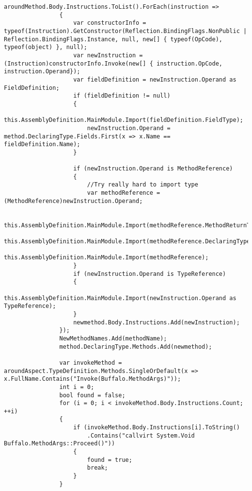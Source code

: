 \begin{lstlisting}[caption={../buffalo/Weaver.cs}, label=../buffalo/Weaver.cs, frame=tb, basicstyle=\scriptsize]
                aroundMethod.Body.Instructions.ToList().ForEach(instruction =>
                {
                    var constructorInfo = typeof(Instruction).GetConstructor(Reflection.BindingFlags.NonPublic | Reflection.BindingFlags.Instance, null, new[] { typeof(OpCode), typeof(object) }, null);
                    var newInstruction = (Instruction)constructorInfo.Invoke(new[] { instruction.OpCode, instruction.Operand});
                    var fieldDefinition = newInstruction.Operand as FieldDefinition;
                    if (fieldDefinition != null)
                    {
                        this.AssemblyDefinition.MainModule.Import(fieldDefinition.FieldType);
                        newInstruction.Operand = method.DeclaringType.Fields.First(x => x.Name == fieldDefinition.Name);
                    }

                    if (newInstruction.Operand is MethodReference)
                    {
                        //Try really hard to import type
                        var methodReference = (MethodReference)newInstruction.Operand;

                        this.AssemblyDefinition.MainModule.Import(methodReference.MethodReturnType.ReturnType);
                        this.AssemblyDefinition.MainModule.Import(methodReference.DeclaringType);
                        this.AssemblyDefinition.MainModule.Import(methodReference);
                    }
                    if (newInstruction.Operand is TypeReference)
                    {
                        this.AssemblyDefinition.MainModule.Import(newInstruction.Operand as TypeReference);
                    }
                    newmethod.Body.Instructions.Add(newInstruction);
                });
                NewMethodNames.Add(methodName);
                method.DeclaringType.Methods.Add(newmethod);

                var invokeMethod = aroundAspect.TypeDefinition.Methods.SingleOrDefault(x => x.FullName.Contains("Invoke(Buffalo.MethodArgs)"));
                int i = 0;
                bool found = false;
                for (i = 0; i < invokeMethod.Body.Instructions.Count; ++i)
                {
                    if (invokeMethod.Body.Instructions[i].ToString()
                        .Contains("callvirt System.Void Buffalo.MethodArgs::Proceed()"))
                    {
                        found = true;
                        break;
                    }
                }


\end{lstlisting}
